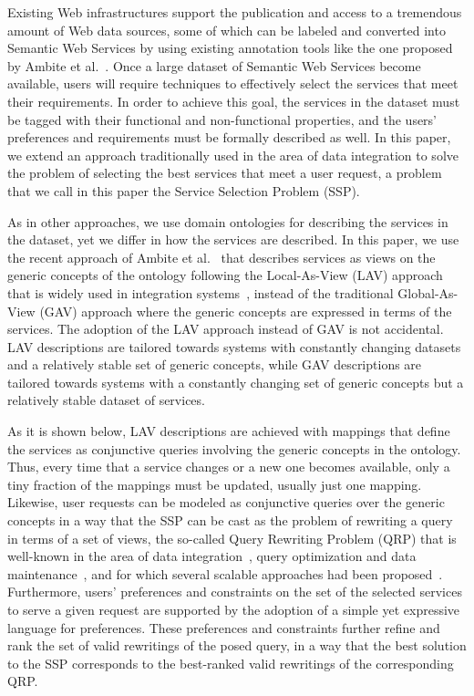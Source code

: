 \documentclass{llncs}
\begin{document}
Existing Web infrastructures support the publication and access to a
tremendous amount of Web data sources, some of which can be labeled
and converted into Semantic Web Services by using existing annotation
tools like the one proposed by Ambite et al.\ \cite{AmbiteISWC09}.
Once a large dataset of Semantic Web Services become available, users
will require techniques to effectively select the services that meet
their requirements.
In order to achieve this goal, the services in the dataset must be
tagged with their functional and non-functional properties, and
the users' preferences and requirements must be formally described
as well.
In this paper, we extend an approach traditionally used in the area of
data integration to solve the problem of selecting the best services
that meet a user request, a problem that we call in this paper the
Service Selection Problem (SSP).

As in other approaches, we use domain ontologies for describing
the services in the dataset, yet we differ in how the services are described.
In this paper, we use the recent approach of Ambite et al.\ \cite{AmbiteISWC09}
that describes services as views on the generic concepts of the ontology
following the Local-As-View (LAV) approach that is widely used in integration
systems~\cite{levy:bucket}, instead of the traditional Global-As-View (GAV)
approach where the generic concepts are expressed in terms of the services.
The adoption of the LAV approach instead of GAV is not accidental.
LAV descriptions are tailored towards systems with constantly changing
datasets and a relatively stable set of generic concepts, while GAV
descriptions are tailored towards systems with a constantly changing
set of generic concepts but a relatively stable dataset of services.

As it is shown below, LAV descriptions are achieved with mappings
that define the services as conjunctive queries involving the generic
concepts in the ontology. Thus, every time that a service changes or
a new one becomes available, only a tiny fraction of the mappings
must be updated, usually just one mapping.
Likewise, user requests can be modeled as conjunctive queries over the
generic concepts in a way that the SSP can be cast as the problem
of rewriting a query in terms of a set of views, the so-called Query
Rewriting Problem (QRP) that is well-known in the area of data
integration~\cite{Chen05,JaudoinPRST05}, query optimization and data
maintenance~\cite{AfratiLU07,levy:bucket}, and for which several
scalable approaches had been
proposed~\cite{arvelo:aaai06,pods:DuschkaG97,sac:DuschkaG97,levy:bucket,pottinger:minicon}.
Furthermore, users' preferences and constraints on the set of the
selected services to serve a given request are supported by the
adoption of a simple yet expressive language for preferences. 
These preferences and constraints further refine and rank 
the set of valid rewritings of the posed query, in a way that
the best solution to the SSP corresponds to the best-ranked 
valid rewritings of the corresponding QRP.
\end{document}
